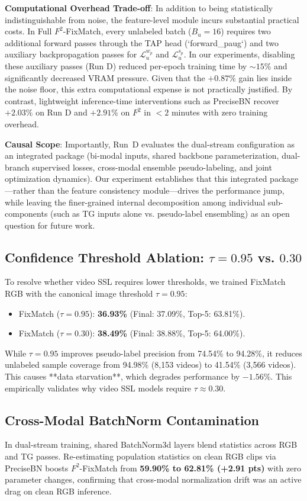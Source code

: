 \documentclass[10pt,twocolumn,letterpaper]{article}
\begin{document}
\noindent \textbf{Computational Overhead Trade-off}:  
In addition to being statistically indistinguishable from noise, the feature-level module incurs substantial practical costs. In Full $F^2$-FixMatch, every unlabeled batch ($B_u = 16$) requires two additional forward passes through the TAP head (`forward_paug`) and two auxiliary backpropagation passes for $\mathcal{L}_u^{w_p}$ and $\mathcal{L}_u^{s_p}$. In our experiments, disabling these auxiliary passes (Run D) reduced per-epoch training time by $\sim 15\%$ and significantly decreased VRAM pressure. Given that the $+0.87\%$ gain lies inside the noise floor, this extra computational expense is not practically justified. By contrast, lightweight inference-time interventions such as PreciseBN recover $+2.03\%$ on Run D and $+2.91\%$ on $F^2$ in $< 2$ minutes with zero training overhead.

\noindent \textbf{Causal Scope}:  
Importantly, Run~D evaluates the dual-stream configuration as an integrated package (bi-modal inputs, shared backbone parameterization, dual-branch supervised losses, cross-modal ensemble pseudo-labeling, and joint optimization dynamics). Our experiment establishes that this integrated package—rather than the feature consistency module—drives the performance jump, while leaving the finer-grained internal decomposition among individual sub-components (such as TG inputs alone vs. pseudo-label ensembling) as an open question for future work.

\subsection{Confidence Threshold Ablation: $\tau = 0.95$ vs. $0.30$}
To resolve whether video SSL requires lower thresholds, we trained FixMatch RGB with the canonical image threshold $\tau = 0.95$:
\begin{itemize}
    \item FixMatch ($\tau = 0.95$): \textbf{36.93\%} (Final: 37.09\%, Top-5: 63.81\%).
    \item FixMatch ($\tau = 0.30$): \textbf{38.49\%} (Final: 38.88\%, Top-5: 64.00\%).
\end{itemize}
While $\tau = 0.95$ improves pseudo-label precision from 74.54\% to 94.28\%, it reduces unlabeled sample coverage from 94.98\% (8,153 videos) to 41.54\% (3,566 videos). This causes **data starvation**, which degrades performance by $-1.56\%$. This empirically validates why video SSL models require $\tau \approx 0.30$.

\subsection{Cross-Modal BatchNorm Contamination}
In dual-stream training, shared BatchNorm3d layers blend statistics across RGB and TG passes. Re-estimating population statistics on clean RGB clips via PreciseBN boosts $F^2$-FixMatch from \textbf{59.90\% to 62.81\% (+2.91 pts)} with zero parameter changes, confirming that cross-modal normalization drift was an active drag on clean RGB inference.
\end{document}
